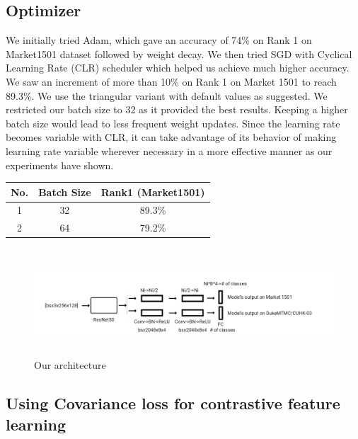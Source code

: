 \documentclass[10pt,twocolumn,letterpaper]{article}
\begin{document}
\subsection{Optimizer}
We initially tried Adam\cite{DBLP:journals/corr/KingmaB14}, which gave an accuracy of 74\% on Rank 1 on Market1501 dataset followed by weight decay. We then tried SGD with Cyclical Learning Rate (CLR)\cite{DBLP:journals/corr/Smith15a} scheduler which helped us achieve much higher accuracy. We saw an increment of more than 10\% on Rank 1 on Market 1501 to reach 89.3\%. We use the triangular variant with default values as suggested. We restricted our batch size to 32 as it provided the best results. Keeping a higher batch size would lead to less frequent weight updates. Since the learning rate becomes variable with CLR, it can take advantage of its behavior of making learning rate variable wherever necessary in a more effective manner as our experiments have shown. 

\begin{center}
 \begin{tabular}{||c c c ||} 
 \hline
 No. & Batch Size & Rank1 (Market1501) \\ [0.5ex] 
 \hline\hline
 1 & 32 & 89.3\% \\ 
 \hline
 2 & 64 & 79.2\% \\    [1ex] 
 \hline
\end{tabular}
\end{center}


\begin{figure}
\includegraphics[width=\textwidth,height=4cm]{our_arch.png}
\caption{Our architecture}
\end{figure}

\subsection{Using Covariance loss for contrastive feature learning}
\end{document}
